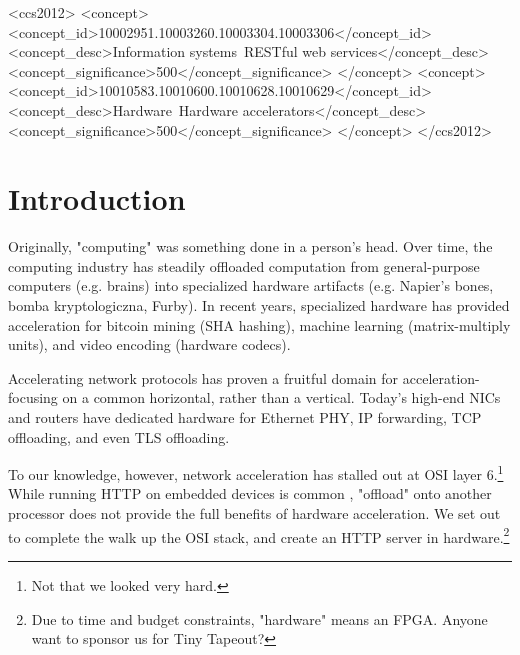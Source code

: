 \documentclass[sigconf,authorversion,nonacm]{acmart}
\begin{document}
\begin{CCSXML}
<ccs2012>
   <concept>
       <concept_id>10002951.10003260.10003304.10003306</concept_id>
       <concept_desc>Information systems~RESTful web services</concept_desc>
       <concept_significance>500</concept_significance>
       </concept>
   <concept>
       <concept_id>10010583.10010600.10010628.10010629</concept_id>
       <concept_desc>Hardware~Hardware accelerators</concept_desc>
       <concept_significance>500</concept_significance>
       </concept>
 </ccs2012>
\end{CCSXML}




\maketitle

\section{Introduction}

Originally, "computing" was something done in a person's head.
Over time, the computing industry has steadily offloaded computation
from general-purpose computers (e.g. brains) into specialized hardware artifacts
(e.g. Napier's bones, bomba kryptologiczna, Furby). In recent years,
specialized hardware has provided acceleration for bitcoin mining (SHA hashing),
machine learning (matrix-multiply units), and video encoding (hardware codecs).

Accelerating network protocols has proven a fruitful domain for acceleration-
focusing on a common horizontal, rather than a vertical. Today's high-end NICs
and routers have dedicated hardware for Ethernet PHY, IP forwarding,
TCP offloading, and even TLS offloading.

To our knowledge, however, network acceleration has stalled out at OSI layer 6.\footnote{Not that we looked very hard.}
While running HTTP on embedded devices is common \cite{esp-idf-http-server},
"offload" onto another processor does not provide the full benefits of hardware acceleration.
We set out to complete the walk up the OSI stack, and create an HTTP server in hardware.\footnote{
Due to time and budget constraints, "hardware" means an FPGA. Anyone want to sponsor us for Tiny Tapeout?\cite{tinytapeout}
}
\end{document}
